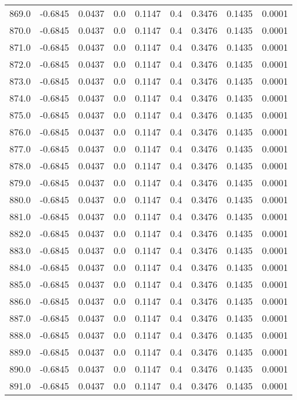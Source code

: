 \begin{longtable}{lrrrrrrrr}
869.0 & -0.6845 & 0.0437 & 0.0 & 0.1147 & 0.4 & 0.3476 & 0.1435 & 0.0001 \\
870.0 & -0.6845 & 0.0437 & 0.0 & 0.1147 & 0.4 & 0.3476 & 0.1435 & 0.0001 \\
871.0 & -0.6845 & 0.0437 & 0.0 & 0.1147 & 0.4 & 0.3476 & 0.1435 & 0.0001 \\
872.0 & -0.6845 & 0.0437 & 0.0 & 0.1147 & 0.4 & 0.3476 & 0.1435 & 0.0001 \\
873.0 & -0.6845 & 0.0437 & 0.0 & 0.1147 & 0.4 & 0.3476 & 0.1435 & 0.0001 \\
874.0 & -0.6845 & 0.0437 & 0.0 & 0.1147 & 0.4 & 0.3476 & 0.1435 & 0.0001 \\
875.0 & -0.6845 & 0.0437 & 0.0 & 0.1147 & 0.4 & 0.3476 & 0.1435 & 0.0001 \\
876.0 & -0.6845 & 0.0437 & 0.0 & 0.1147 & 0.4 & 0.3476 & 0.1435 & 0.0001 \\
877.0 & -0.6845 & 0.0437 & 0.0 & 0.1147 & 0.4 & 0.3476 & 0.1435 & 0.0001 \\
878.0 & -0.6845 & 0.0437 & 0.0 & 0.1147 & 0.4 & 0.3476 & 0.1435 & 0.0001 \\
879.0 & -0.6845 & 0.0437 & 0.0 & 0.1147 & 0.4 & 0.3476 & 0.1435 & 0.0001 \\
880.0 & -0.6845 & 0.0437 & 0.0 & 0.1147 & 0.4 & 0.3476 & 0.1435 & 0.0001 \\
881.0 & -0.6845 & 0.0437 & 0.0 & 0.1147 & 0.4 & 0.3476 & 0.1435 & 0.0001 \\
882.0 & -0.6845 & 0.0437 & 0.0 & 0.1147 & 0.4 & 0.3476 & 0.1435 & 0.0001 \\
883.0 & -0.6845 & 0.0437 & 0.0 & 0.1147 & 0.4 & 0.3476 & 0.1435 & 0.0001 \\
884.0 & -0.6845 & 0.0437 & 0.0 & 0.1147 & 0.4 & 0.3476 & 0.1435 & 0.0001 \\
885.0 & -0.6845 & 0.0437 & 0.0 & 0.1147 & 0.4 & 0.3476 & 0.1435 & 0.0001 \\
886.0 & -0.6845 & 0.0437 & 0.0 & 0.1147 & 0.4 & 0.3476 & 0.1435 & 0.0001 \\
887.0 & -0.6845 & 0.0437 & 0.0 & 0.1147 & 0.4 & 0.3476 & 0.1435 & 0.0001 \\
888.0 & -0.6845 & 0.0437 & 0.0 & 0.1147 & 0.4 & 0.3476 & 0.1435 & 0.0001 \\
889.0 & -0.6845 & 0.0437 & 0.0 & 0.1147 & 0.4 & 0.3476 & 0.1435 & 0.0001 \\
890.0 & -0.6845 & 0.0437 & 0.0 & 0.1147 & 0.4 & 0.3476 & 0.1435 & 0.0001 \\
891.0 & -0.6845 & 0.0437 & 0.0 & 0.1147 & 0.4 & 0.3476 & 0.1435 & 0.0001 \\

\end{longtable}
